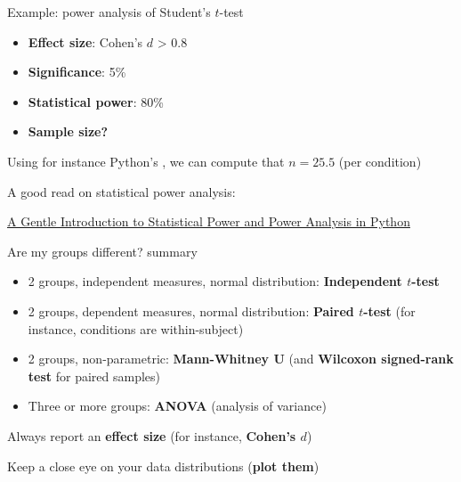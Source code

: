 \documentclass[compress]{beamer}
\begin{document}
\begin{frame}{Example: power analysis of Student's $t$-test}

    \begin{itemize}
        \item \textbf{Effect size}: Cohen's $d$ > 0.8
        \item \textbf{Significance}: 5\%
        \item \textbf{Statistical power}: 80\%
        \item \textbf{Sample size?}

    \end{itemize}

    \pause

    Using for instance Python's ,
    we can compute that $n=25.5$ (per condition)

    \pause

    A good read on statistical power analysis:

    \href{https://machinelearningmastery.com/statistical-power-and-power-analysis-in-python/}{A
    Gentle Introduction to Statistical Power and Power Analysis in Python}
\end{frame}

\begin{frame}{Are my groups different? summary}

    \begin{itemize}
        \item<+-> 2 groups, independent measures, normal distribution:
            \textbf{Independent $t$-test}
        \item<+-> 2 groups, dependent measures, normal distribution: \textbf{Paired
            $t$-test} (for instance, conditions are within-subject)
        \item<+-> 2 groups, non-parametric: \textbf{Mann-Whitney U} (and
            \textbf{Wilcoxon signed-rank test} for paired samples)
        \item<+-> Three or more groups: \textbf{ANOVA} (analysis of variance)
    \end{itemize}

    \pause

    \begin{center}
    Always report an \textbf{effect size} (for instance, \textbf{Cohen's $d$})

    \pause

        Keep a close eye on your data distributions (\textbf{plot them})
    \end{center}


\end{frame}
\end{document}
